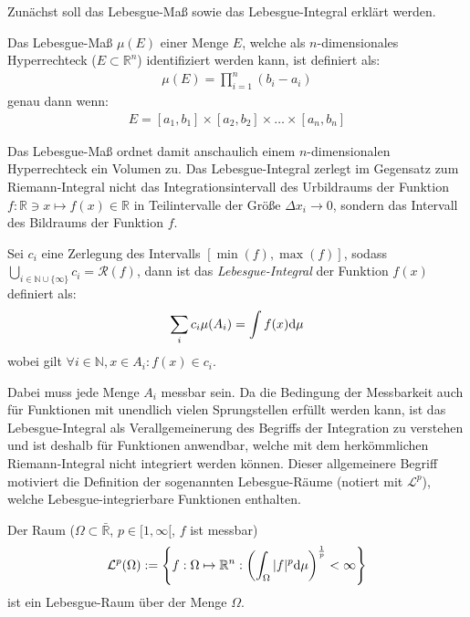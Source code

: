Zunächst soll das Lebesgue-Maß sowie das Lebesgue-Integral erklärt werden. 
\begin{Definitionbox}[]
    Das Lebesgue-Maß $\mu(E)$ einer Menge $E$, welche als $n$-dimensionales Hyperrechteck ($E\subset \mathbb{R}^n$) identifiziert werden kann, ist definiert als:
    \begin{align*}
        \mu(E)= \prod_{i=1}^{n}{(b_i - a_i)}
    \end{align*}
    genau dann wenn:
    \begin{align*}
        E=[a_1 , b_1] \times [a_2 , b_2] \times \ldots \times [a_n , b_n]
    \end{align*}
\end{Definitionbox}
Das Lebesgue-Maß ordnet damit anschaulich einem $n$-dimensionalen Hyperrechteck ein Volumen zu.
Das Lebesgue-Integral zerlegt im Gegensatz zum Riemann-Integral nicht das Integrationsintervall des Urbildraums der Funktion $f:\mathbb{R} \ni x \mapsto f(x)\in \mathbb{R}$ in Teilintervalle der Größe $\Delta x_i \to 0$, sondern das Intervall des Bildraums der Funktion $f$.
\begin{Definitionbox}[]
    Sei $c_i$ eine Zerlegung des Intervalls $[\min(f),\max(f)]$, sodass $\bigcup_{i\in \mathbb{N}\cup \{\infty\}}c_i = \mathscr{R}(f)$, dann ist das \emph{Lebesgue-Integral} der Funktion $f(x)$ definiert als:
    \begin{align*}
        \sum_{i}{c_i \mu(A_i)} = \int{f(x) \text{d}{\mu}}
    \end{align*}
    wobei gilt $\forall i \in \mathbb{N},x\in A_i : f(x)\in c_i$.


\end{Definitionbox}
Dabei muss jede Menge $A_i$ messbar sein. 
Da die Bedingung der Messbarkeit auch für Funktionen mit unendlich vielen Sprungstellen erfüllt werden kann, ist das Lebesgue-Integral als Verallgemeinerung des Begriffs der Integration zu verstehen und ist deshalb für Funktionen anwendbar, welche mit dem herkömmlichen Riemann-Integral nicht integriert werden können. Dieser allgemeinere Begriff motiviert die Definition der sogenannten Lebesgue-Räume (notiert mit $\mathcal{L}^p$), welche Lebesgue-integrierbare Funktionen enthalten.
\begin{Definitionbox}[]
    Der Raum ($\Omega \subset \bar{\mathbb{R}}$, $p\in [1,\infty[$, $f$ ist messbar)
    \begin{align*}
        \mathcal{L}^p (\Omega) := \left\{f:\Omega \mapsto \mathbb{R}^{n} : \left(\int_{\Omega}{|f|^{p}\text{d}{\mu}} \right)^{\frac{1}{p}}< \infty \right\}
    \end{align*}
    ist ein Lebesgue-Raum über der Menge $\Omega$.
\end{Definitionbox}
